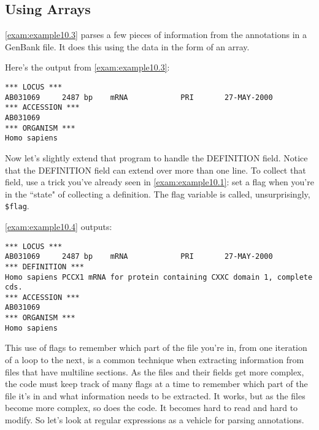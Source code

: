 \subsection{Using Arrays}
\autoref{exam:example10.3} parses a few pieces of information from the annotations in a GenBank file. It does this using the data in the form of an array.
  


Here's the output from \autoref{exam:example10.3}:

\begin{lstlisting}
*** LOCUS ***
AB031069     2487 bp    mRNA            PRI       27-MAY-2000
*** ACCESSION ***
AB031069
*** ORGANISM ***
Homo sapiens
\end{lstlisting}

Now let's slightly extend that program to handle the DEFINITION field. Notice that the DEFINITION field can extend over more than one line. To collect that field, use a trick you've already seen in \autoref{exam:example10.1}: set a flag when you're in the ``state" of collecting a definition. The flag variable is called, unsurprisingly, \verb|$flag|.



\autoref{exam:example10.4} outputs:

\begin{lstlisting}
*** LOCUS ***
AB031069     2487 bp    mRNA            PRI       27-MAY-2000
*** DEFINITION ***
Homo sapiens PCCX1 mRNA for protein containing CXXC domain 1, complete
cds.
*** ACCESSION ***
AB031069
*** ORGANISM ***
Homo sapiens
\end{lstlisting}

This use of flags to remember which part of the file you're in, from one iteration of a loop to the next, is a common technique when extracting information from files that have multiline sections. As the files and their fields get more complex, the code must keep track of many flags at a time to remember which part of the file it's in and what information needs to be extracted. It works, but as the files become more complex, so does the code. It becomes hard to read and hard to modify. So let's look at regular expressions as a vehicle for parsing annotations.

